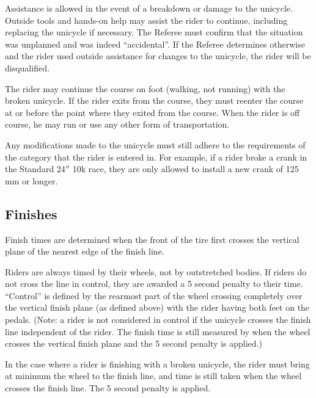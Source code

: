 Assistance is allowed in the event of a breakdown or damage to the unicycle.
Outside tools and hands-on help may assist the rider to continue, including replacing the unicycle if necessary.
The Referee must confirm that the situation was unplanned and was indeed ``accidental''.
If the Referee determines otherwise and the rider used outside assistance for changes to the unicycle, the rider will be disqualified.

The rider may continue the course on foot (walking, not running) with the broken unicycle.
If the rider exits from the course, they must reenter the course at or before the point where they exited from the course.
When the rider is off course, he may run or use any other form of transportation.

Any modifications made to the unicycle must still adhere to the requirements of the category that the rider is entered in.
For example, if a rider broke a crank in the Standard 24$''$ 10k race, they are only allowed to install a new crank of 125 mm or longer.


\subsection{Finishes}

Finish times are determined when the front of the tire first crosses the vertical plane of the nearest edge of the finish line. 

Riders are always timed by their wheels, not by outstretched bodies.
If riders do not cross the line in control, they are awarded a 5 second penalty to their time.
``Control'' is defined by the rearmost part of the wheel crossing completely over the vertical finish plane (as defined above) with the rider having both feet on the pedals.
(Note: a rider is not considered in control if the unicycle crosses the finish line independent of the rider.
The finish time is still measured by when the wheel crosses the vertical finish plane and the 5 second penalty is applied.)

In the case where a rider is finishing with a broken unicycle, the rider must bring at minimum the wheel to the finish line, and time is still taken when the wheel crosses the finish line.
The 5 second penalty is applied.
